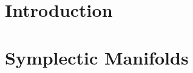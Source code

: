 \documentclass[12pt]{book}
\begin{document}
\todototoc
\listoftodos[]


\section*{Introduction}

\section*{Symplectic Manifolds}

\end{document}
